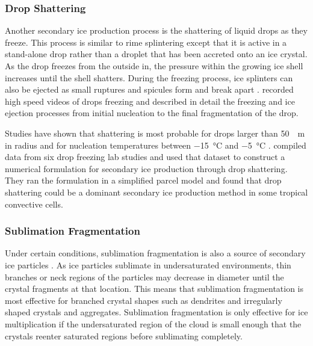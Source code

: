 \subsubsection{Drop Shattering}
Another secondary ice production process is the shattering of liquid drops as they freeze. This process is similar to rime splintering except that it is active in a stand-alone drop rather than a droplet that has been accreted onto an ice crystal. As the drop freezes from the outside in, the pressure within the growing ice shell increases until the shell shatters. During the freezing process, ice splinters can also be ejected as small ruptures and spicules form and break apart \citep{kei2020}. \cite{wild2017} recorded high speed videos of drops freezing and described in detail the freezing and ice ejection processes from initial nucleation to the final fragmentation of the drop.

Studies have shown that shattering is most probable for drops larger than \SI{50}{\mu m} in radius and for nucleation temperatures between \SI{-15}{\degreeCelsius} and \SI{-5}{\degreeCelsius} \citep[e.g.][]{mason1960, brow1968, frid2007}. \cite{phil2018} compiled data from six drop freezing lab studies and used that dataset to construct a numerical formulation for secondary ice production through drop shattering. They ran the formulation in a simplified parcel model and found that drop shattering could be a dominant secondary ice production method in some tropical convective cells.

\subsubsection{Sublimation Fragmentation}
Under certain conditions, sublimation fragmentation is also a source of secondary ice particles \citep{bacon1998}. As ice particles sublimate in undersaturated environments, thin branches or neck regions of the particles may decrease in diameter until the crystal fragments at that location. This means that sublimation fragmentation is most effective for branched crystal shapes such as dendrites and irregularly shaped crystals and aggregates. Sublimation fragmentation is only effective for ice multiplication if the undersaturated region of the cloud is small enough that the crystals reenter saturated regions before sublimating completely.

